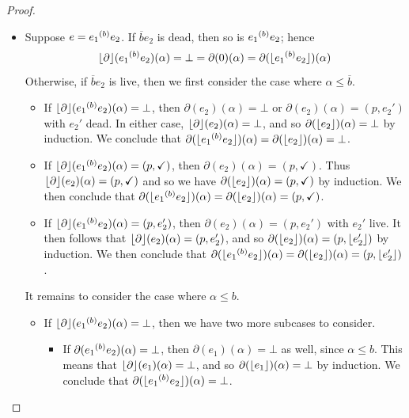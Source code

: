 \documentclass[orivec,envcountsect,envcountsame]{llncs}
\begin{document}
\begin{proof}
\begin{itemize}
		\item
		Suppose $e = e_1 {\mathbin{^{(b)}}} e_2$.
		If $\overline{b}e_2$ is dead, then so is $e_1 {\mathbin{^{(b)}}} e_2$; hence
		\[
		\lfloor\partial\rfloor(e_1 {\mathbin{^{(b)}}} e_2)(\alpha) = \bot = \partial(0)(\alpha) = \partial(\lfloor e_1 {\mathbin{^{(b)}}} e_2\rfloor)(\alpha)
		\]
		Otherwise, if $\overline{b}e_2$ is live, then we first consider the case where $\alpha \leq \overline{b}$.
		\begin{itemize}
			\item
			If $\lfloor\partial\rfloor(e_1 {\mathbin{^{(b)}}} e_2)(\alpha) = \bot$, then $\partial(e_2)(\alpha) = \bot$ or $\partial(e_2)(\alpha) = (p, e_2')$ with $e_2'$ dead.
			In either case, $\lfloor\partial\rfloor(e_2)(\alpha) = \bot$, and so $\partial(\lfloor e_2\rfloor)(\alpha) = \bot$ by induction.
			We conclude that $\partial(\lfloor e_1 {\mathbin{^{(b)}}} e_2\rfloor)(\alpha) = \partial(\lfloor e_2\rfloor)(\alpha) = \bot$.

			\item
			If $\lfloor\partial\rfloor(e_1 {\mathbin{^{(b)}}} e_2)(\alpha) = (p, \checkmark)$, then $\partial(e_2)(\alpha) = (p, \checkmark)$.
			Thus $\lfloor\partial\rfloor(e_2)(\alpha) = (p, \checkmark)$ and so we have $\partial(\lfloor e_2\rfloor)(\alpha) = (p, \checkmark)$ by induction.
			We then conclude that $\partial(\lfloor e_1 {\mathbin{^{(b)}}} e_2\rfloor)(\alpha) = \partial(\lfloor e_2\rfloor)(\alpha) = (p, \checkmark)$.

			\item
			If $\lfloor\partial\rfloor(e_1 {\mathbin{^{(b)}}} e_2)(\alpha) = (p, e_2')$, then $\partial(e_2)(\alpha) = (p, e_2')$ with $e_2'$ live.
			It then follows that $\lfloor\partial\rfloor(e_2)(\alpha) = (p, e_2')$, and so $\partial(\lfloor e_2\rfloor)(\alpha) = (p, \lfloor e_2'\rfloor)$ by induction.
			We then conclude that $\partial(\lfloor e_1 {\mathbin{^{(b)}}} e_2\rfloor)(\alpha) = \partial(\lfloor e_2\rfloor)(\alpha) = (p, \lfloor e_2'\rfloor)$.
		\end{itemize}
		It remains to consider the case where $\alpha \leq b$.
		\begin{itemize}
			\item
			If $\lfloor\partial\rfloor(e_1 {\mathbin{^{(b)}}} e_2)(\alpha) = \bot$, then we have two more subcases to consider.
			\begin{itemize}
				\item
				If $\partial(e_1 {\mathbin{^{(b)}}} e_2)(\alpha) = \bot$, then $\partial(e_1)(\alpha) = \bot$ as well, since $\alpha \leq b$.
				This means that $\lfloor\partial\rfloor(e_1)(\alpha) = \bot$, and so $\partial(\lfloor e_1\rfloor)(\alpha) = \bot$ by induction.
				We conclude that $\partial(\lfloor e_1 {\mathbin{^{(b)}}} e_2\rfloor)(\alpha) = \bot$.


\end{itemize}
\end{itemize}
\end{itemize}
\end{proof}
\end{document}
